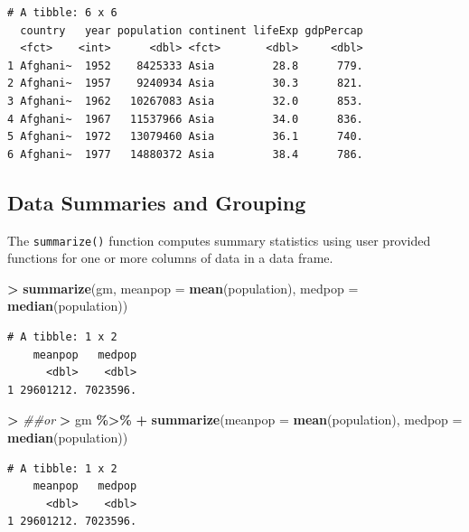 \documentclass[
]{krantz}
\makeatletter
\newenvironment{Shaded}{\begin{snugshade}}{\end{snugshade}}
\newcommand{\CommentTok}[1]{\textcolor[rgb]{0.37,0.37,0.37}{\textit{#1}}}
\newcommand{\DataTypeTok}[1]{\textcolor[rgb]{0.27,0.27,0.27}{#1}}
\newcommand{\ErrorTok}[1]{\textcolor[rgb]{0.14,0.14,0.14}{\textbf{#1}}}
\newcommand{\KeywordTok}[1]{\textcolor[rgb]{0.27,0.27,0.27}{\textbf{#1}}}
\newcommand{\NormalTok}[1]{#1}
\newcommand{\OperatorTok}[1]{\textcolor[rgb]{0.43,0.43,0.43}{\textbf{#1}}}
\newcommand{\StringTok}[1]{\textcolor[rgb]{0.5,0.5,0.5}{#1}}
\newenvironment{kframe}{%
\medskip{}
\setlength{\fboxsep}{.8em}
 \def\at@end@of@kframe{}%
 \ifinner\ifhmode%
  \def\at@end@of@kframe{\end{minipage}}%
  \begin{minipage}{\columnwidth}%
 \fi\fi%
 \def\FrameCommand##1{\hskip\@totalleftmargin \hskip-\fboxsep
 \colorbox{shadecolor}{##1}\hskip-\fboxsep
     \hskip-\linewidth \hskip-\@totalleftmargin \hskip\columnwidth}%
 \MakeFramed {\advance\hsize-\width
   \@totalleftmargin\z@ \linewidth\hsize
   \@setminipage}}%
 {\par\unskip\endMakeFramed%
 \at@end@of@kframe}
\renewenvironment{Shaded}{\begin{kframe}}{\end{kframe}}
\makeatother
\begin{document}
\begin{verbatim}
# A tibble: 6 x 6
  country   year population continent lifeExp gdpPercap
  <fct>    <int>      <dbl> <fct>       <dbl>     <dbl>
1 Afghani~  1952    8425333 Asia         28.8      779.
2 Afghani~  1957    9240934 Asia         30.3      821.
3 Afghani~  1962   10267083 Asia         32.0      853.
4 Afghani~  1967   11537966 Asia         34.0      836.
5 Afghani~  1972   13079460 Asia         36.1      740.
6 Afghani~  1977   14880372 Asia         38.4      786.
\end{verbatim}

\hypertarget{data-summaries-and-grouping}{%
\subsection{Data Summaries and Grouping}\label{data-summaries-and-grouping}}

The \texttt{summarize()} function computes summary statistics using user provided functions for one or more columns of data in a data frame.

\begin{Shaded}
\begin{Highlighting}[]
\OperatorTok{\textgreater{}}\StringTok{ }\KeywordTok{summarize}\NormalTok{(gm, }\DataTypeTok{meanpop =} \KeywordTok{mean}\NormalTok{(population), }\DataTypeTok{medpop =} \KeywordTok{median}\NormalTok{(population))}
\end{Highlighting}
\end{Shaded}

\begin{verbatim}
# A tibble: 1 x 2
    meanpop   medpop
      <dbl>    <dbl>
1 29601212. 7023596.
\end{verbatim}

\begin{Shaded}
\begin{Highlighting}[]
\OperatorTok{\textgreater{}}\StringTok{ }\CommentTok{\#\#or}
\ErrorTok{\textgreater{}}\StringTok{ }\NormalTok{gm }\OperatorTok{\%\textgreater{}\%}\StringTok{ }
\OperatorTok{+}\StringTok{   }\KeywordTok{summarize}\NormalTok{(}\DataTypeTok{meanpop =} \KeywordTok{mean}\NormalTok{(population), }\DataTypeTok{medpop =} \KeywordTok{median}\NormalTok{(population))}
\end{Highlighting}
\end{Shaded}

\begin{verbatim}
# A tibble: 1 x 2
    meanpop   medpop
      <dbl>    <dbl>
1 29601212. 7023596.
\end{verbatim}
\end{document}
